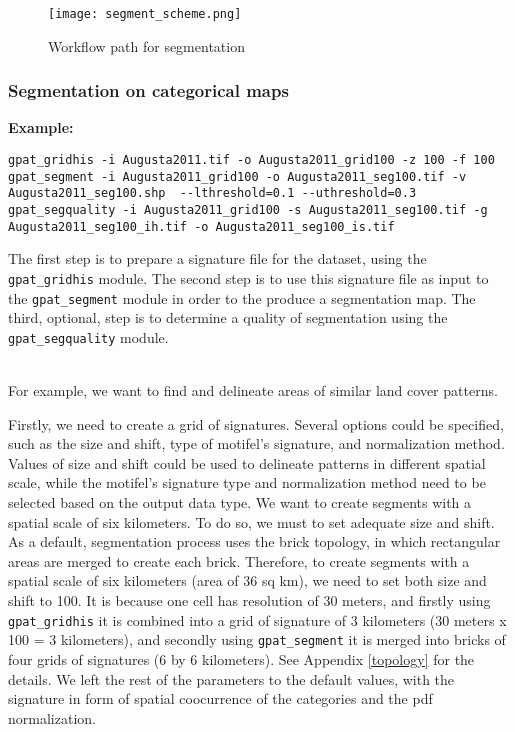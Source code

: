 \begin{figure}[H]
	\centering
	\texttt{[image: segment\_scheme.png]}
	\caption{Workflow path for segmentation}
	\label{FIG:SEGMENT}
\end{figure}

\subsubsection{Segmentation on categorical maps}

{\bf Example:}

\begin{minipage}{\linewidth}
\begin{lstlisting}
gpat_gridhis -i Augusta2011.tif -o Augusta2011_grid100 -z 100 -f 100
gpat_segment -i Augusta2011_grid100 -o Augusta2011_seg100.tif -v Augusta2011_seg100.shp  --lthreshold=0.1 --uthreshold=0.3
gpat_segquality -i Augusta2011_grid100 -s Augusta2011_seg100.tif -g Augusta2011_seg100_ih.tif -o Augusta2011_seg100_is.tif
\end{lstlisting}
\end{minipage}

The first step is to prepare a signature file for the dataset, using the {\tt gpat\_gridhis} module.
The second step is to use this signature file as input to the {\tt gpat\_segment} module in order to the produce a segmentation map. 
The third, optional, step is to determine a quality of segmentation using the {\tt gpat\_segquality} module.\\\\

\newpage

For example, we want to find and delineate areas of similar land cover patterns. 

Firstly, we need to create a grid of signatures. 
Several options could be specified, such as the size and shift, type of motifel's signature, and normalization method.
Values of size and shift could be used to delineate patterns in different spatial scale, while the motifel's signature type and normalization method need to be selected based on the output data type.
We want to create segments with a spatial scale of six kilometers. 
To do so, we must to set adequate size and shift. 
As a default, segmentation process uses the brick topology, in which rectangular areas are merged to create each brick.
Therefore, to create segments with a spatial scale of six kilometers (area of 36 sq km), we need to set both size and shift to 100.
It is because one cell has resolution of 30 meters, and firstly using {\tt gpat\_gridhis} it is combined into a grid of signature of 3 kilometers (30 meters x 100 = 3 kilometers), and secondly using {\tt gpat\_segment} it is merged into bricks of four grids of signatures (6 by 6 kilometers). 
See Appendix \ref{topology} for the details.
We left the rest of the parameters to the default values, with the signature in form of spatial coocurrence of the categories and the pdf normalization.

